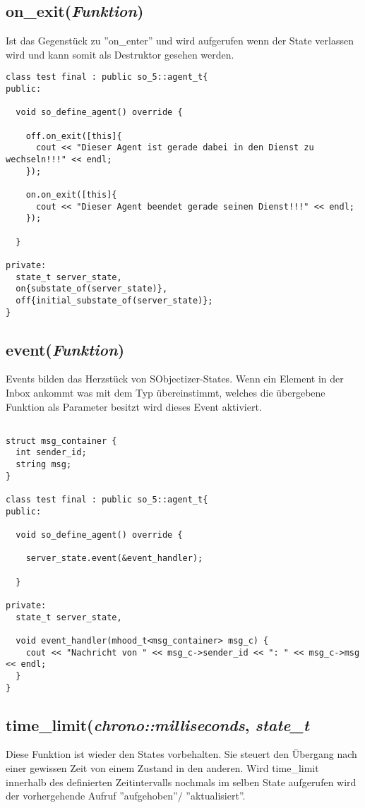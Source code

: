 \subsection{on\_exit(\textit{Funktion})}
Ist das Gegenstück zu ''on\_enter'' und wird aufgerufen wenn der State verlassen wird und kann somit als Destruktor
gesehen werden.

\begin{verbatim}
class test final : public so_5::agent_t{
public:

  void so_define_agent() override {
  
    off.on_exit([this]{
      cout << "Dieser Agent ist gerade dabei in den Dienst zu wechseln!!!" << endl;
    });
    
    on.on_exit([this]{
      cout << "Dieser Agent beendet gerade seinen Dienst!!!" << endl;
    });
  
  }

private:
  state_t server_state,
  on{substate_of(server_state)},
  off{initial_substate_of(server_state)};
}
\end{verbatim}

\subsection{event(\textit{Funktion})}
Events bilden das Herzstück von SObjectizer-States. Wenn ein Element in der Inbox ankommt was
mit dem Typ übereinstimmt, welches die übergebene Funktion als Parameter besitzt wird dieses Event
aktiviert.

\begin{verbatim}

struct msg_container {
  int sender_id;
  string msg;
}

class test final : public so_5::agent_t{
public:

  void so_define_agent() override {
  
    server_state.event(&event_handler);
  
  }

private:
  state_t server_state,
  
  void event_handler(mhood_t<msg_container> msg_c) {
    cout << "Nachricht von " << msg_c->sender_id << ": " << msg_c->msg << endl;
  }
}
\end{verbatim}

\subsection{time\_limit(\textit{chrono::milliseconds}, \textit{state\_t}}
Diese Funktion ist wieder den States vorbehalten. Sie steuert den Übergang nach einer gewissen Zeit von einem Zustand in den anderen.
Wird time\_limit innerhalb des definierten Zeitintervalls nochmals im selben State aufgerufen wird der vorhergehende Aufruf ''aufgehoben''/
''aktualisiert''.

